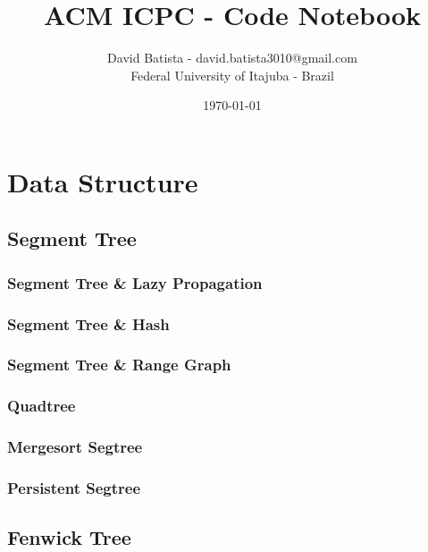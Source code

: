 \documentclass[10pt,a4paper]{report}
\begin{document}
\title{ACM ICPC - Code Notebook}
\author{David Batista - david.batista3010@gmail.com \\ Federal University of Itajuba - Brazil}
\date{\today}
\maketitle
\tableofcontents

\chapter{Data Structure}
	
	\section{Segment Tree}
		\subsection{Segment Tree \& Lazy Propagation}
			
		\newpage
		\subsection{Segment Tree \& Hash}
			
		\newpage
		\subsection{Segment Tree \& Range Graph}
			
		\newpage
		\subsection{Quadtree}
			
		\newpage
		\subsection{Mergesort Segtree}
			
		\newpage
		\subsection{Persistent Segtree}
			
	
	\newpage		
	\section{Fenwick Tree}
\end{document}
